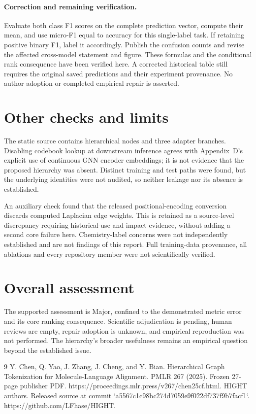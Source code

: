 \documentclass[10pt]{article}
\begin{document}
\paragraph*{Correction and remaining verification.}\mbox{}\par
Evaluate both class F1 scores on the complete prediction vector, compute their mean, and use micro-F1 equal to accuracy for this single-label task. If retaining positive binary F1, label it accordingly. Publish the confusion counts and revise the affected cross-model statement and figure. These formulas and the conditional rank consequence have been verified here. A corrected historical table still requires the original saved predictions and their experiment provenance. No author adoption or completed empirical repair is asserted.\par
\section*{Other checks and limits}
The static source contains hierarchical nodes and three adapter branches. Disabling codebook lookup at downstream inference agrees with Appendix D’s explicit use of continuous GNN encoder embeddings; it is not evidence that the proposed hierarchy was absent. Distinct training and test paths were found, but the underlying identities were not audited, so neither leakage nor its absence is established.\par
An auxiliary check found that the released positional-encoding conversion discards computed Laplacian edge weights. This is retained as a source-level discrepancy requiring historical-use and impact evidence, without adding a second core failure here. Chemistry-label concerns were not independently established and are not findings of this report. Full training-data provenance, all ablations and every repository member were not scientifically verified.\par
\section*{Overall assessment}
The supported assessment is Major, confined to the demonstrated metric error and its core ranking consequence. Scientific adjudication is pending, human reviews are empty, repair adoption is unknown, and empirical reproduction was not performed. The hierarchy’s broader usefulness remains an empirical question beyond the established issue.\par
9 Y. Chen, Q. Yao, J. Zhang, J. Cheng, and Y. Bian. Hierarchical Graph Tokenization for Molecule-Language Alignment. PMLR 267 (2025). Frozen 27-page publisher PDF. https://proceedings.mlr.press/v267/chen25cf.html. HIGHT authors. Released source at commit `a5567c1c98bc274d7059e9f022df737f9b7facf1`. https://github.com/LFhase/HIGHT.\par
\end{document}
